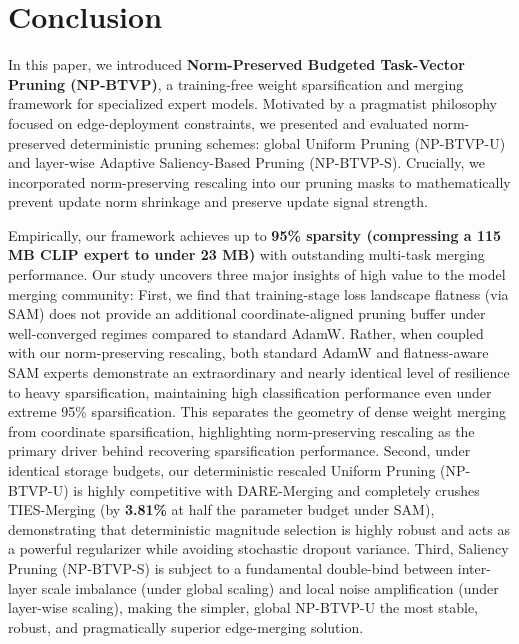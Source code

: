 \section{Conclusion}
\label{submission:sec:conclusion}

In this paper, we introduced \textbf{Norm-Preserved Budgeted Task-Vector Pruning (NP-BTVP)}, a training-free weight sparsification and merging framework for specialized expert models. Motivated by a pragmatist philosophy focused on edge-deployment constraints, we presented and evaluated norm-preserved deterministic pruning schemes: global Uniform Pruning (NP-BTVP-U) and layer-wise Adaptive Saliency-Based Pruning (NP-BTVP-S). Crucially, we incorporated norm-preserving rescaling into our pruning masks to mathematically prevent update norm shrinkage and preserve update signal strength.

Empirically, our framework achieves up to \textbf{95\% sparsity (compressing a 115 MB CLIP expert to under 23 MB)} with outstanding multi-task merging performance. Our study uncovers three major insights of high value to the model merging community:
First, we find that training-stage loss landscape flatness (via SAM) does not provide an additional coordinate-aligned pruning buffer under well-converged regimes compared to standard AdamW. Rather, when coupled with our norm-preserving rescaling, both standard AdamW and flatness-aware SAM experts demonstrate an extraordinary and nearly identical level of resilience to heavy sparsification, maintaining high classification performance even under extreme 95\% sparsification. This separates the geometry of dense weight merging from coordinate sparsification, highlighting norm-preserving rescaling as the primary driver behind recovering sparsification performance.
Second, under identical storage budgets, our deterministic rescaled Uniform Pruning (NP-BTVP-U) is highly competitive with DARE-Merging and completely crushes TIES-Merging (by \textbf{3.81\%} at half the parameter budget under SAM), demonstrating that deterministic magnitude selection is highly robust and acts as a powerful regularizer while avoiding stochastic dropout variance.
Third, Saliency Pruning (NP-BTVP-S) is subject to a fundamental double-bind between inter-layer scale imbalance (under global scaling) and local noise amplification (under layer-wise scaling), making the simpler, global NP-BTVP-U the most stable, robust, and pragmatically superior edge-merging solution.

